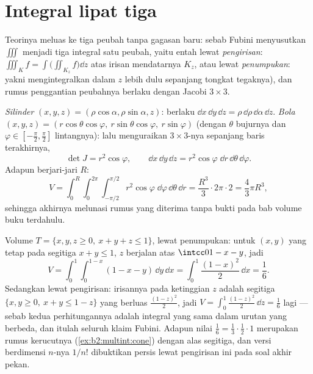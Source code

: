 \section{Integral lipat tiga}

Teorinya meluas ke tiga peubah tanpa gagasan baru: sebab Fubini
menyusutkan $\iiint$ menjadi tiga integral satu peubah, yaitu entah lewat
\emph{pengirisan}: $\iiint_K f = \int\bigl(\iint_{K_z}
f\bigr)\dd z$ atas irisan mendatarnya $K_z$, atau lewat
\emph{penumpukan}: yakni mengintegralkan dalam $z$ lebih dulu sepanjang tongkat tegaknya),
dan rumus penggantian peubahnya berlaku dengan Jacobi
$3 \times 3$.

\begin{example}\label{ex:b2:multint:spherical}
\emph{Silinder} $(x, y, z) = (\rho\cos\alpha, \rho\sin\alpha,
z)$: berlaku $\dd x\,\dd y\,\dd z = \rho\,\dd\rho\,\dd\alpha\,\dd z$.
\emph{Bola} $(x, y, z) = (r\cos\theta\cos\varphi,\
r\sin\theta\cos\varphi,\ r\sin\varphi)$ (dengan $\theta$ bujurnya dan
$\varphi \in [-\frac\pi2, \frac\pi2]$ lintangnya): lalu menguraikan 
$3 \times 3$-nya sepanjang baris terakhirnya,
\[
\det J = r^2\cos\varphi ,
\qquad
\dd x\,\dd y\,\dd z
= r^2\cos\varphi\;\dd r\,\dd\theta\,\dd\varphi .
\]
Adapun  berjari-jari $R$:
\[
V = \int_0^R\!\!\int_0^{2\pi}\!\!\int_{-\pi/2}^{\pi/2}
r^2\cos\varphi\;\dd\varphi\,\dd\theta\,\dd r
= \frac{R^3}{3}\cdot 2\pi \cdot 2
= \boxed{\frac43\pi R^3} ,
\]
sehingga akhirnya melunasi rumus yang diterima tanpa bukti pada bab volume
buku terdahulu.
\end{example}

\begin{example}
\label{ex:b2:multint:tetra}
Volume $T = \{x, y, z \geq 0,\ x + y + z \leq 1\}$, lewat
penumpukan: untuk $(x, y)$ yang tetap pada segitiga $x + y \leq 1$,
$z$ berjalan atas $\intcc0{1 - x - y}$, jadi
\[
V = \int_0^1\!\!\int_0^{1-x}(1 - x - y)\,\dd y\,\dd x
= \int_0^1\frac{(1 - x)^2}{2}\,\dd x = \frac16 .
\]
Sedangkan lewat pengirisan: irisannya pada ketinggian $z$ adalah segitiga $\{x, y
\geq 0,\ x + y \leq 1 - z\}$ yang berluas $\frac{(1-z)^2}2$, jadi
$V = \int_0^1\frac{(1-z)^2}2\,\dd z = \frac16$ lagi --- sebab
kedua perhitungannya adalah integral yang sama dalam urutan yang
berbeda, dan itulah seluruh klaim Fubini. Adapun nilai $\frac16 =
\frac13\cdot\frac12\cdot1$ merupakan rumus kerucutnya
(\cref{ex:b2:multint:cone}) dengan alas segitiga, dan
versi berdimensi $n$-nya $1/n!$ dibuktikan persis lewat pengirisan
ini pada soal akhir pekan.
\end{example}


